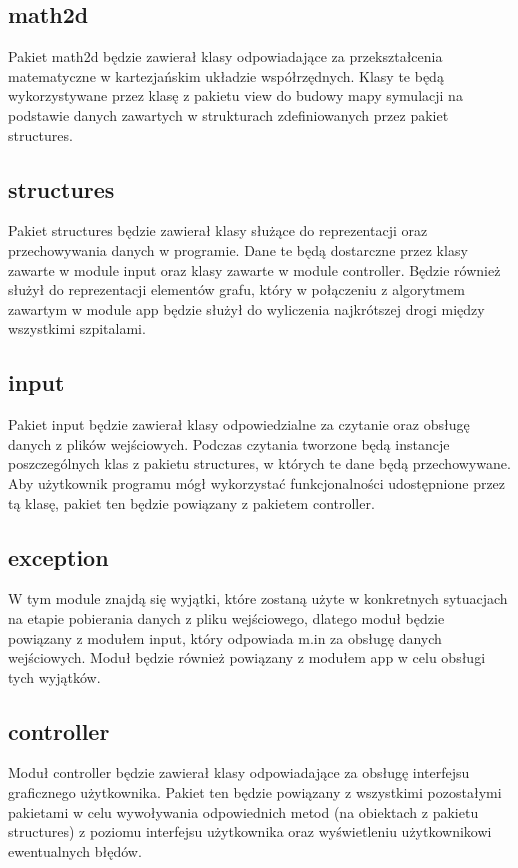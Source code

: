 \documentclass{article}
\begin{document}
    \subsection{math2d}
    Pakiet math2d będzie zawierał klasy odpowiadające za przekształcenia matematyczne w kartezjańskim układzie współrzędnych. Klasy te będą wykorzystywane przez klasę z pakietu view do budowy mapy symulacji na podstawie danych zawartych w strukturach zdefiniowanych przez pakiet structures.

    \subsection{structures}
    Pakiet structures będzie zawierał klasy służące do reprezentacji oraz przechowywania danych w programie. Dane te będą dostarczne przez klasy zawarte w module input oraz klasy zawarte w module controller. Będzie również służył do reprezentacji elementów grafu, który w połączeniu z algorytmem zawartym w module app będzie służył do wyliczenia najkrótszej drogi między wszystkimi szpitalami.

    \subsection{input}
    Pakiet input będzie zawierał klasy odpowiedzialne za czytanie oraz obsługę danych z plików wejściowych. Podczas czytania tworzone będą instancje poszczególnych klas z pakietu structures, w których te dane będą przechowywane. Aby użytkownik programu mógł wykorzystać funkcjonalności udostępnione przez tą klasę, pakiet ten będzie powiązany z pakietem controller.

    \subsection{exception}
    W tym module znajdą się wyjątki, które zostaną użyte w konkretnych sytuacjach na etapie pobierania danych z pliku wejściowego, dlatego moduł będzie powiązany z modułem input, który odpowiada m.in za obsługę danych wejściowych. Moduł będzie również powiązany z modułem app w celu obsługi tych wyjątków.

    \subsection{controller}
    Moduł controller będzie zawierał klasy odpowiadające za obsługę interfejsu graficznego użytkownika. Pakiet ten będzie powiązany z wszystkimi pozostałymi pakietami w celu wywoływania odpowiednich metod (na obiektach z pakietu structures) z poziomu interfejsu użytkownika oraz wyświetleniu użytkownikowi ewentualnych błędów.
\end{document}
